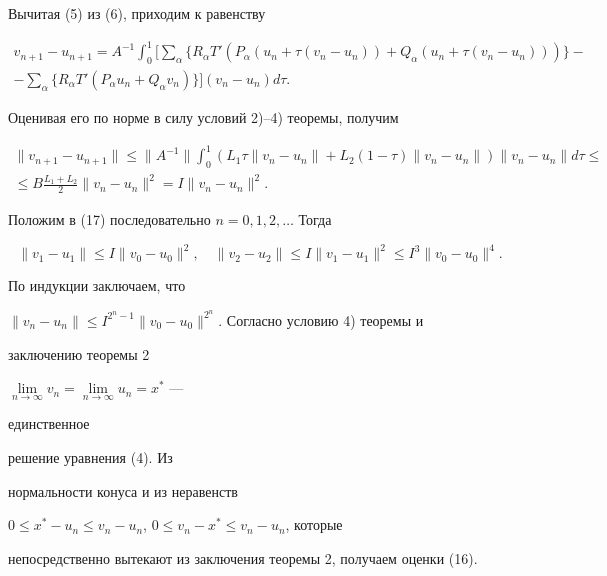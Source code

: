 \begin{pf} Вычитая (5) из (6), приходим к равенству


\begin{gather*}


v_{n+1}-u_{n+1}=


A^{-1}\int^1_0\biggl[\sum_\alpha\{R_\alpha


T'(P_\alpha(u_n+\tau(v_n-u_n))+


Q_\alpha(u_n+\tau(v_n-u_n)))\}- \\


-\sum_\alpha\{R_\alpha T'(P_\alpha u_n+Q_\alpha v_n)\}\biggr]


(v_n-u_n)d\tau.


\end{gather*}


Оценивая его по норме в силу условий 2)--4) теоремы, получим


\begin{multline}


\|v_{n+1}-u_{n+1}\|\le\|A^{-1}\|\int^1_0


(L_1\tau\|v_n-u_n\|+L_2(1-\tau)\|v_n-u_n\|)


\|v_n-u_n\|d\tau\le \\


\le B\frac{L_1+L_2}{2}\|v_n-u_n\|^2=I\|v_n-u_n\|^2.


\end{multline}


Положим в (17) последовательно $n=0,1,2,\dotsc$ Тогда


$$


\|v_1-u_1\|\le I\|v_0-u_0\|^2,\quad


\|v_2-u_2\|\le I\|v_1-u_1\|^2\le


I^3\|v_0-u_0\|^4.


$$


По индукции заключаем, что


$\|v_n-u_n\|\le I^{2^n-1}\|v_0-u_0\|^{2^n}$. Согласно условию 4) теоремы и


заключению теоремы 2\;


$\lim\limits_{n\to\infty}v_n=\lim\limits_{n\to\infty}u_n=x^*$ ---


единственное


решение уравнения (4). Из


нормальности конуса и из неравенств


$0\le x^*-u_n\le v_n-u_n$, $0\le v_n-x^*\le v_n-u_n$, которые


непосредственно вытекают из заключения теоремы 2, получаем оценки (16).


\end{pf}





